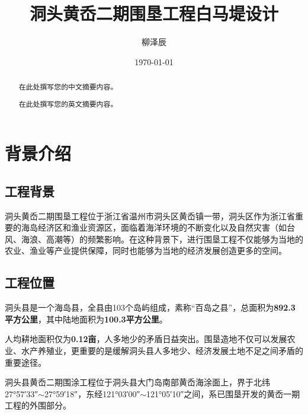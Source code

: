 \documentclass[UTF8, a4paper, 12pt]{ctexart} %
\title{洞头黄岙二期围垦工程白马堤设计}
\author{柳泽辰}
\date{\today}
\begin{document}
\maketitle
\newpage
\section*{\centering}
\begin{abstract}
  在此处撰写您的中文摘要内容。
\end{abstract}
\newpage

\section*{\centering }
\begin{abstract}
  在此处撰写您的英文摘要内容。
\end{abstract}
\newpage
% 
\tableofcontents
\newpage

\section{背景介绍}

\subsection{工程背景}
洞头黄岙二期围垦工程位于浙江省温州市洞头区黄岙镇一带，洞头区作为浙江省重要的海岛经济区和渔业资源区，面临着海洋环境的不断变化以及自然灾害（如台风、海浪、高潮等）的频繁影响。在这种背景下，进行围垦工程不仅能够为当地的农业、渔业等产业提供保障，同时也能够为当地的经济发展创造更多的空间。
\subsection{工程位置}
洞头县是一个海岛县，全县由103个岛屿组成，素称“百岛之县”，总面积为\textbf{892.3平方公里}，其中陆地面积为\textbf{100.3平方公里}。

人均耕地面积仅为\textbf{0.12亩}，人多地少的矛盾日益突出。围垦造地不仅可以发展农业、水产养殖业，更重要的是缓解洞头县人多地少、经济发展土地不足之间矛盾的重要途径。

洞头县黄岙二期围涂工程位于洞头县大门岛南部黄岙海涂面上，界于北纬27°57′33″$\sim$27°59′18″，东经121°03′00″$\sim$121°05′10″之间，系已围垦开发的黄岙一期工程的外围部分。
\end{document}

